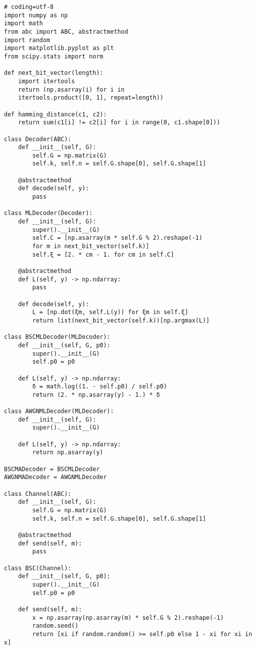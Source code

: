 \documentclass{article}
\begin{document}
\begin{lstlisting}[frame=single]
# coding=utf-8
import numpy as np
import math
from abc import ABC, abstractmethod
import random
import matplotlib.pyplot as plt
from scipy.stats import norm

def next_bit_vector(length):
    import itertools
    return (np.asarray(i) for i in
    itertools.product([0, 1], repeat=length))

def hamming_distance(c1, c2):
    return sum(c1[i] != c2[i] for i in range(0, c1.shape[0]))

class Decoder(ABC):
    def __init__(self, G):
        self.G = np.matrix(G)
        self.k, self.n = self.G.shape[0], self.G.shape[1]

    @abstractmethod
    def decode(self, y):
        pass

class MLDecoder(Decoder):
    def __init__(self, G):
        super().__init__(G)
        self.C = [np.asarray(m * self.G % 2).reshape(-1) 
        for m in next_bit_vector(self.k)]
        self.ξ = [2. * cm - 1. for cm in self.C]

    @abstractmethod
    def L(self, y) -> np.ndarray:
        pass

    def decode(self, y):
        L = [np.dot(ξm, self.L(y)) for ξm in self.ξ]
        return list(next_bit_vector(self.k))[np.argmax(L)]

class BSCMLDecoder(MLDecoder):
    def __init__(self, G, p0):
        super().__init__(G)
        self.p0 = p0

    def L(self, y) -> np.ndarray:
        δ = math.log((1. - self.p0) / self.p0)
        return (2. * np.asarray(y) - 1.) * δ

class AWGNMLDecoder(MLDecoder):
    def __init__(self, G):
        super().__init__(G)

    def L(self, y) -> np.ndarray:
        return np.asarray(y)

BSCMADecoder = BSCMLDecoder
AWGNMADecoder = AWGNMLDecoder

class Channel(ABC):
    def __init__(self, G):
        self.G = np.matrix(G)
        self.k, self.n = self.G.shape[0], self.G.shape[1]

    @abstractmethod
    def send(self, m):
        pass

class BSC(Channel):
    def __init__(self, G, p0):
        super().__init__(G)
        self.p0 = p0

    def send(self, m):
        x = np.asarray(np.asarray(m) * self.G % 2).reshape(-1)
        random.seed()
        return [xi if random.random() >= self.p0 else 1 - xi for xi in x]


\end{lstlisting}
\end{document}

